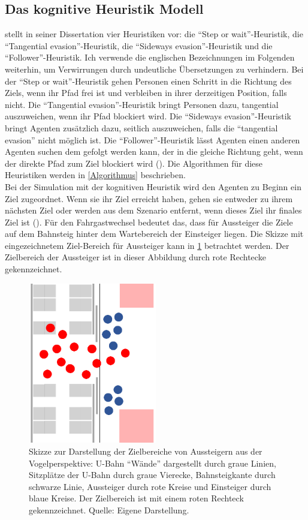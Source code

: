 \subsection{Das kognitive Heuristik Modell} \label{CHM}
\cite{Seitz.2016} stellt in seiner Dissertation vier Heuristiken vor: die "`Step or wait"'-Heuristik, die "`Tangential evasion"'-Heuristik, die "`Sideways evasion"'-Heuristik und die "`Follower"'-Heuristik. Ich verwende die englischen Bezeichnungen im Folgenden weiterhin, um Verwirrungen durch undeutliche Übersetzungen zu verhindern. Bei der "`Step or wait"'-Heuristik gehen Personen einen Schritt in die Richtung des Ziels, wenn ihr Pfad frei ist und verbleiben in ihrer derzeitigen Position, falls nicht. Die "`Tangential evasion"'-Heuristik bringt Personen dazu, tangential auszuweichen, wenn ihr Pfad blockiert wird. Die "`Sideways evasion"'-Heuristik bringt Agenten zusätzlich dazu, seitlich auszuweichen, falls die "`tangential evasion"' nicht möglich ist. Die "`Follower"'-Heuristik lässt Agenten einen anderen Agenten suchen dem gefolgt werden kann, der in die gleiche Richtung geht, wenn der direkte Pfad zum Ziel blockiert wird (\cite{Seitz.2016}). Die Algorithmen für diese Heuristiken werden in \ref{Algorithmus} beschrieben. \\
Bei der Simulation mit der kognitiven Heuristik wird den Agenten zu Beginn ein Ziel zugeordnet. Wenn sie ihr Ziel erreicht haben, gehen sie entweder zu ihrem nächsten Ziel oder werden aus dem Szenario entfernt, wenn dieses Ziel ihr finales Ziel ist (\cite{Seitz.2016}). Für den Fahrgastwechsel bedeutet das, dass für Aussteiger die Ziele auf dem Bahnsteig hinter dem Wartebereich der Einsteiger liegen.
Die Skizze mit eingezeichnetem Ziel-Bereich für Aussteiger kann in \figurename \ref{fig:SkizzeAussteiger} betrachtet werden. Der Zielbereich der Aussteiger ist in dieser Abbildung durch rote Rechtecke gekennzeichnet.
\begin{figure}[H]
	\centering
		\includegraphics[angle=270, width=0.5\textwidth]{pictures/model/kognitive_heuristic_model/alight_sketch.png}
	\caption{Skizze zur Darstellung der Zielbereiche von Aussteigern aus der Vogelperspektive: U-Bahn "`Wände"' dargestellt durch graue Linien, Sitzplätze der U-Bahn durch graue Vierecke, Bahnsteigkante durch schwarze Linie, Aussteiger durch rote Kreise und Einsteiger durch blaue Kreise. Der Zielbereich ist mit einem roten Rechteck gekennzeichnet. Quelle: Eigene Darstellung.}
	\label{fig:SkizzeAussteiger}
\end{figure}
